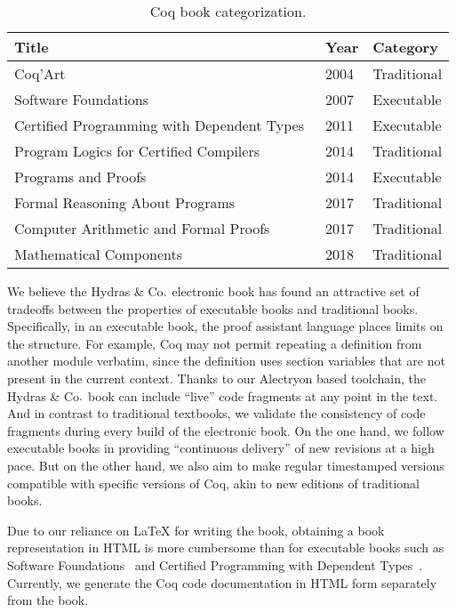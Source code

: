 \documentclass{easychair}
\newcommand{\alectr}{Alectryon\xspace}
\newcommand{\Hydras}{Hydras \& Co$\text.$\xspace}
\begin{document}
\begin{table}
  \centering
  \footnotesize
  \begin{tabular}{lll}
  \hline
  \textbf{Title} & \textbf{Year} & \textbf{Category}\\
  \hline
  Coq'Art~\cite{BC04} & 2004 & Traditional\\
  Software Foundations~\cite{SF} & 2007 & Executable\\
  Certified Programming with Dependent Types~\cite{chlipalacpdt2011} & 2011 &  Executable\\
  Program Logics for Certified Compilers~\cite{Appel2014} & 2014 & Traditional\\
  Programs and Proofs~\cite{Sergey:PnP} & 2014 & Executable\\
  Formal Reasoning About Programs~\cite{Chlipala2017} & 2017 & Traditional\\
  Computer Arithmetic and Formal Proofs~\cite{Boldo2017} & 2017 & Traditional\\
  Mathematical Components~\cite{MCB} & 2018 & Traditional\\
  \hline
  \end{tabular}
  \caption{Coq book categorization.}
  \label{tbl:books}
\end{table}

We believe the \Hydras electronic book has found an attractive set of tradeoffs between the properties of executable books and traditional books. Specifically, in an executable book, the proof assistant language places limits on the structure. For example, Coq may not permit repeating a definition from another module verbatim, since the definition uses section variables that are not present in the current context. Thanks to our \alectr based toolchain, the \Hydras book can include ``live'' code fragments at any point in the text. And in contrast to traditional textbooks, we validate the consistency of code fragments during every build of the electronic book. On the one hand, we follow executable books in providing ``continuous delivery'' of new revisions at a high pace. But on the other hand, we also aim to make regular timestamped versions compatible with specific versions of Coq, akin to new editions of traditional books.

Due to our reliance on LaTeX for writing the book, obtaining a book representation in HTML is more cumbersome than for executable books such as Software Foundations~\cite{SF} and Certified Programming with Dependent Types~\cite{chlipalacpdt2011}. Currently, we generate the Coq code documentation in HTML form separately from the book.
\end{document}
